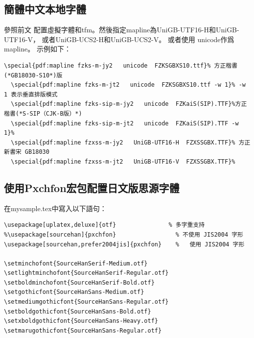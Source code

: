 \begin{figure}[H]
\par\quad{}
\begin{center}
\end{center}
\end{figure}

\subsection{簡體中文本地字體}

\par{}參照前文
配置虛擬字體和tfm。然後指定mapline為{UniGB-UTF16-H}和{UniGB-UTF16-V}，
或者{UniGB-UCS2-H}和{UniGB-UCS2-V}。 或者使用 {unicode}作爲{mapline}。
示例如下：

\begin{lstlisting}[firstnumber=1]
  \special{pdf:mapline fzks-m-jy2   unicode  FZKSGBXS10.ttf}% 方正楷書 (*GB18030-S10*)版
  \special{pdf:mapline fzks-m-jt2   unicode  FZKSGBXS10.ttf -w 1}% -w 1 表示垂直排版模式
  \special{pdf:mapline fzks-sip-m-jy2   unicode  FZKaiS(SIP).TTF}%方正楷書(*S-SIP（CJK-B版）*)
  \special{pdf:mapline fzks-sip-m-jt2   unicode  FZKaiS(SIP).TTF -w 1}%
  \special{pdf:mapline fzxss-m-jy2   UniGB-UTF16-H  FZXSSGBX.TTF}% 方正新書宋 GB18030
  \special{pdf:mapline fzxss-m-jt2   UniGB-UTF16-V  FZXSSGBX.TTF}%
\end{lstlisting}

\subsection{使用{Pxchfon}宏包配置日文版思源字體}
\par{}在{mysample.tex}中寫入以下語句：

\begin{lstlisting}[firstnumber=1]
\usepackage[uplatex,deluxe]{otf}               % 多字重支持
%\usepackage[sourcehan]{pxchfon}                 % 不使用 JIS2004 字形
\usepackage[sourcehan,prefer2004jis]{pxchfon}    %   使用 JIS2004 字形

\setminchofont{SourceHanSerif-Medium.otf}
\setlightminchofont{SourceHanSerif-Regular.otf}
\setboldminchofont{SourceHanSerif-Bold.otf}
\setgothicfont{SourceHanSans-Medium.otf}
\setmediumgothicfont{SourceHanSans-Regular.otf}
\setboldgothicfont{SourceHanSans-Bold.otf}
\setxboldgothicfont{SourceHanSans-Heavy.otf}
\setmarugothicfont{SourceHanSans-Regular.otf}
\end{lstlisting}

